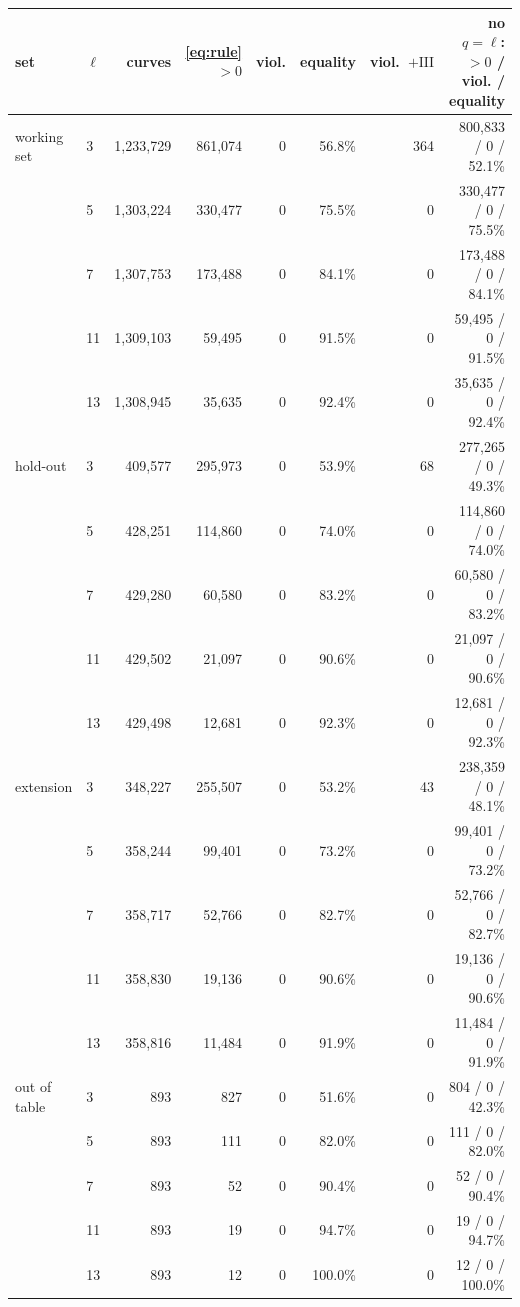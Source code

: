 \begin{tabular}{llrrrrrr}
\toprule
set & $\ell$ & curves & \eqref{eq:rule} $>0$ & viol. & equality & viol.\ $+\mathrm{III}$ & no $q=\ell$: $>0$ / viol. / equality\\
\midrule
working set & 3 & 1,233,729 & 861,074 & 0 & 56.8\% & 364 & 800,833 / 0 / 52.1\% \\
 & 5 & 1,303,224 & 330,477 & 0 & 75.5\% & 0 & 330,477 / 0 / 75.5\% \\
 & 7 & 1,307,753 & 173,488 & 0 & 84.1\% & 0 & 173,488 / 0 / 84.1\% \\
 & 11 & 1,309,103 & 59,495 & 0 & 91.5\% & 0 & 59,495 / 0 / 91.5\% \\
 & 13 & 1,308,945 & 35,635 & 0 & 92.4\% & 0 & 35,635 / 0 / 92.4\% \\
\midrule
hold-out & 3 & 409,577 & 295,973 & 0 & 53.9\% & 68 & 277,265 / 0 / 49.3\% \\
 & 5 & 428,251 & 114,860 & 0 & 74.0\% & 0 & 114,860 / 0 / 74.0\% \\
 & 7 & 429,280 & 60,580 & 0 & 83.2\% & 0 & 60,580 / 0 / 83.2\% \\
 & 11 & 429,502 & 21,097 & 0 & 90.6\% & 0 & 21,097 / 0 / 90.6\% \\
 & 13 & 429,498 & 12,681 & 0 & 92.3\% & 0 & 12,681 / 0 / 92.3\% \\
\midrule
extension & 3 & 348,227 & 255,507 & 0 & 53.2\% & 43 & 238,359 / 0 / 48.1\% \\
 & 5 & 358,244 & 99,401 & 0 & 73.2\% & 0 & 99,401 / 0 / 73.2\% \\
 & 7 & 358,717 & 52,766 & 0 & 82.7\% & 0 & 52,766 / 0 / 82.7\% \\
 & 11 & 358,830 & 19,136 & 0 & 90.6\% & 0 & 19,136 / 0 / 90.6\% \\
 & 13 & 358,816 & 11,484 & 0 & 91.9\% & 0 & 11,484 / 0 / 91.9\% \\
\midrule
out of table & 3 & 893 & 827 & 0 & 51.6\% & 0 & 804 / 0 / 42.3\% \\
 & 5 & 893 & 111 & 0 & 82.0\% & 0 & 111 / 0 / 82.0\% \\
 & 7 & 893 & 52 & 0 & 90.4\% & 0 & 52 / 0 / 90.4\% \\
 & 11 & 893 & 19 & 0 & 94.7\% & 0 & 19 / 0 / 94.7\% \\
 & 13 & 893 & 12 & 0 & 100.0\% & 0 & 12 / 0 / 100.0\% \\
\bottomrule
\end{tabular}
